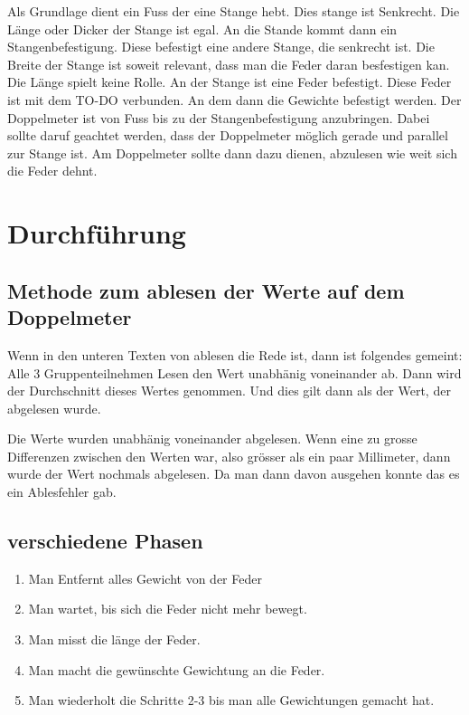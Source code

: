 \documentclass[../main.tex]{subfiles} %
\begin{document}
    Als Grundlage dient ein Fuss der eine Stange hebt. Dies stange ist Senkrecht. 
    Die Länge oder Dicker der Stange ist egal. An die Stande kommt dann ein Stangenbefestigung. 
    Diese befestigt eine andere Stange, die senkrecht ist. 
    Die Breite der Stange ist soweit relevant, dass man die Feder daran besfestigen kan. Die Länge spielt keine Rolle.
    An der Stange ist eine Feder befestigt. Diese Feder ist mit dem TO-DO verbunden.
    An dem dann die Gewichte befestigt werden.
    Der Doppelmeter ist von Fuss bis zu der Stangenbefestigung anzubringen. Dabei sollte daruf geachtet werden, dass der Doppelmeter möglich gerade und parallel zur Stange ist.
    Am Doppelmeter sollte dann dazu dienen, abzulesen wie weit sich die Feder dehnt.

    \section{Durchführung}\label{sec:durchführung}
    
    \subsection{Methode zum ablesen der Werte auf dem Doppelmeter}\label{subsec:methode-zum-ablesen-der-werte-auf-dem-doppelmeter}

    Wenn in den unteren Texten von ablesen die Rede ist, dann ist folgendes gemeint:
    Alle 3 Gruppenteilnehmen Lesen den Wert unabhänig voneinander ab. Dann wird der Durchschnitt dieses Wertes genommen. Und dies gilt dann als der Wert, der abgelesen wurde.

    \begin{tcolorbox}[title=Hinweis beim Ablesen]
        Die Werte wurden unabhänig voneinander abgelesen.
        Wenn eine zu grosse Differenzen zwischen den Werten war, also grösser als ein paar Millimeter, dann wurde der Wert nochmals abgelesen.
        Da man dann davon ausgehen konnte das es ein Ablesfehler gab.
    \end{tcolorbox}

    
    \subsection{verschiedene Phasen}\label{subsec:schritt-für-schritt-anleitung}
    \begin{enumerate}
        \item Man Entfernt alles Gewicht von der Feder
        \item Man wartet, bis sich die Feder nicht mehr bewegt.
        \item Man misst die länge der Feder.
        \item Man macht die gewünschte Gewichtung an die Feder.
        \item Man wiederholt die Schritte 2-3 bis man alle Gewichtungen gemacht hat.
    \end{enumerate}
\end{document}
